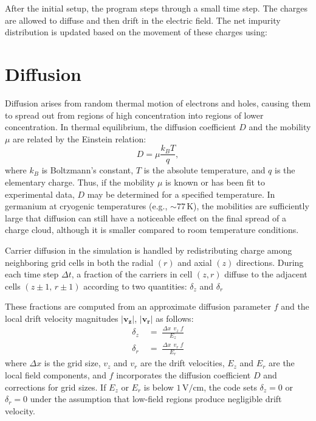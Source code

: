 After the initial setup, the program steps through a small time step. The charges are allowed to diffuse and then drift in the electric field. The net impurity distribution is updated based on the movement of these charges using:


\section{Diffusion}
Diffusion arises from random thermal motion of electrons and holes, causing them to spread out from regions of high concentration into regions of lower concentration. In thermal equilibrium, the diffusion coefficient $D$ and the mobility $\mu$
are related by the Einstein relation:
\begin{equation}
D = \mu \frac{k_B T}{q},
\end{equation}
where $k_B$ is Boltzmann's constant, $T$ is the absolute temperature, and $q$ is
the elementary charge. Thus, if the mobility $\mu$ is known or has been fit to
experimental data, $D$ may be determined for a specified temperature. In
germanium at cryogenic temperatures (e.g., $\sim 77$\,K), the mobilities are
sufficiently large that diffusion can still have a noticeable effect on the
final spread of a charge cloud, although it is smaller compared to room
temperature conditions.


Carrier diffusion in the simulation is handled by redistributing charge among
neighboring grid cells in both the radial $(r)$ and axial $(z)$ directions.
During each time step $\Delta t$, a fraction of the carriers in cell $(z,r)$
diffuse to the adjacent cells $(z\pm1,\,r\pm1)$ according to two quantities: $\delta_z$ and $\delta_r$

These fractions are computed from an approximate diffusion parameter 
$f$ and the local drift velocity magnitudes $\lvert \mathbf{v_z} \rvert$, 
$\lvert \mathbf{v_r} \rvert$ as follows:
\begin{align}
   \delta_z &\;=\; \frac{\Delta x \;\,v_z \;f}{E_z}\label{eq:deltaez}\\
   \delta_r &\;=\; \frac{\Delta x \;\,v_r \;f}{E_r} \label{eq:deltaer}
\end{align}
where $\Delta x$ is the grid size, 
$v_{z}$ and $v_{r}$ are the drift velocities, 
$E_{z}$ and $E_{r}$ are the local field components, 
and $f$ incorporates the diffusion coefficient $D$ and corrections for grid sizes.
If $E_z$ or $E_r$ is below $1\,\mathrm{V/cm}$, the code sets 
$\delta_z = 0$ or $\delta_r=0$ under the assumption that low-field regions produce negligible drift velocity.



